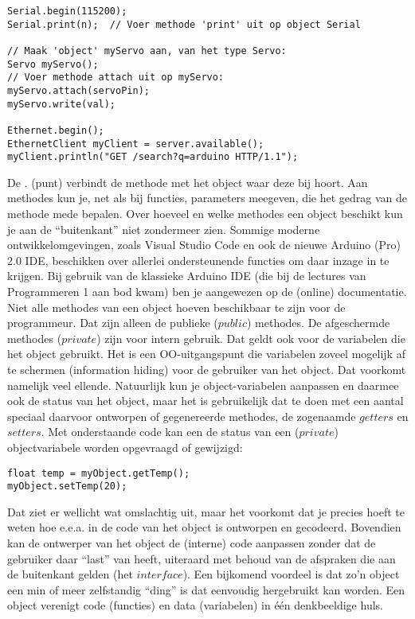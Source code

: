 \begin{lstlisting}[language=Arduino]
Serial.begin(115200);
Serial.print(n);  // Voer methode 'print' uit op object Serial

// Maak 'object' myServo aan, van het type Servo:
Servo myServo();  
// Voer methode attach uit op myServo:
myServo.attach(servoPin); 
myServo.write(val);

Ethernet.begin();
EthernetClient myClient = server.available();
myClient.println("GET /search?q=arduino HTTP/1.1");
\end{lstlisting}

De $.$ (punt) verbindt de methode met het object waar deze bij hoort. Aan methodes kun je, net als bij functies, parameters meegeven, die het gedrag van de methode mede bepalen. Over hoeveel en welke methodes een object beschikt kun je aan de “buitenkant” niet zondermeer zien. Sommige moderne ontwikkelomgevingen, zoals Visual Studio Code en ook de nieuwe Arduino (Pro) 2.0 IDE, beschikken over allerlei ondersteunende functies om daar inzage in te krijgen.\newline 
Bij gebruik van de klassieke Arduino IDE (die bij de lectures van Programmeren 1 aan bod kwam) ben je aangewezen op de (online) documentatie. Niet alle methodes van een object hoeven beschikbaar te zijn voor de programmeur. Dat zijn alleen de publieke ($public$) methodes. De afgeschermde methodes ($private$) zijn voor intern gebruik. Dat geldt ook voor de variabelen die het object gebruikt. Het is een OO-uitgangspunt die variabelen zoveel mogelijk af te schermen (information hiding) voor de gebruiker van het object. Dat voorkomt namelijk veel ellende. Natuurlijk kun je object-variabelen aanpassen en daarmee ook de status van het object, maar het is gebruikelijk dat te doen met een aantal speciaal daarvoor ontworpen of gegenereerde methodes, de zogenaamde $getters$ en $setters$. Met onderstaande code kan een de status van een ($private$) objectvariabele worden opgevraagd of gewijzigd:

\begin{lstlisting}[language=Arduino]
float temp = myObject.getTemp();
myObject.setTemp(20);
\end{lstlisting}

Dat ziet er wellicht wat omslachtig uit, maar het voorkomt dat je precies hoeft te weten hoe e.e.a. in de code van het object is ontworpen en gecodeerd. Bovendien kan de ontwerper van het object de (interne) code aanpassen zonder dat de gebruiker daar “last” van heeft, uiteraard met behoud van de afspraken die aan de buitenkant gelden (het $interface$). Een bijkomend voordeel is dat zo’n object een min of meer zelfstandig “ding” is dat eenvoudig hergebruikt kan worden. Een object verenigt code (functies) en data (variabelen) in één denkbeeldige huls. \newline \newline

